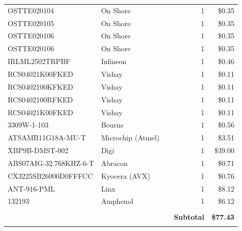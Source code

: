 \documentclass[journal,compsoc]{IEEEtran}
\begin{document}
\begin{table}[]
\begin{tabular}{|rrr|r|r|}
    \multicolumn{1}{|l}{OSTTE020104} & \multicolumn{1}{l}{On Shore} & \multicolumn{1}{r}{} & \multicolumn{1}{r}{1} & \$0.35  \\
    \multicolumn{1}{|l}{OSTTE020105} & \multicolumn{1}{l}{On Shore} & \multicolumn{1}{r}{} & \multicolumn{1}{r}{1} & \$0.35  \\
    \multicolumn{1}{|l}{OSTTE020106} & \multicolumn{1}{l}{On Shore} & \multicolumn{1}{r}{} & \multicolumn{1}{r}{1} & \$0.35  \\
    \multicolumn{1}{|l}{OSTTE020106} & \multicolumn{1}{l}{On Shore} & \multicolumn{1}{r}{} & \multicolumn{1}{r}{1} & \$0.35  \\
    \multicolumn{1}{|l}{IRLML2502TRPBF} & \multicolumn{1}{l}{Infineon} & \multicolumn{1}{r}{} & \multicolumn{1}{r}{1} & \$0.46  \\
    \multicolumn{1}{|l}{RCS04021K00FKED} & \multicolumn{1}{l}{Vishay} & \multicolumn{1}{r}{} & \multicolumn{1}{r}{1} & \$0.11  \\
    \multicolumn{1}{|l}{RCS0402100KFKED} & \multicolumn{1}{l}{Vishay} & \multicolumn{1}{r}{} & \multicolumn{1}{r}{1} & \$0.11  \\
    \multicolumn{1}{|l}{RCS0402100RFKED} & \multicolumn{1}{l}{Vishay} & \multicolumn{1}{r}{} & \multicolumn{1}{r}{1} & \$0.11  \\
    \multicolumn{1}{|l}{RCS04021K00FKED} & \multicolumn{1}{l}{Vishay} & \multicolumn{1}{r}{} & \multicolumn{1}{r}{1} & \$0.11  \\
    \multicolumn{1}{|l}{3309W-1-103} & \multicolumn{1}{l}{Bourns} & \multicolumn{1}{r}{} & \multicolumn{1}{r}{1} & \$0.56  \\
    \multicolumn{1}{|l}{ATSAMB11G18A-MU-T} & \multicolumn{1}{l}{Microchip (Atmel)} & \multicolumn{1}{r}{} & \multicolumn{1}{r}{1} & \$3.51  \\
    \multicolumn{1}{|l}{XBP9B-DMST-002} & \multicolumn{1}{l}{Digi} & \multicolumn{1}{r}{} & \multicolumn{1}{r}{1} & \$39.00  \\
    \multicolumn{1}{|l}{ABS07AIG-32.768KHZ-6-T} & \multicolumn{1}{l}{Abracon} & \multicolumn{1}{r}{} & \multicolumn{1}{r}{1} & \$0.71  \\
    \multicolumn{1}{|l}{CX3225SB26000D0FFFCC} & \multicolumn{1}{l}{Kyocera (AVX)} & \multicolumn{1}{r}{} & \multicolumn{1}{r}{1} & \$0.76  \\
    \multicolumn{1}{|l}{ANT-916-PML} & \multicolumn{1}{l}{Linx} & \multicolumn{1}{r}{} & \multicolumn{1}{r}{1} & \$8.12  \\
    \multicolumn{1}{|l}{132193} & \multicolumn{1}{l}{Amphenol} & \multicolumn{1}{r}{} & \multicolumn{1}{r}{1} & \$6.12  \\
          &       & \multicolumn{1}{r}{} & \multicolumn{1}{r}{} &  \\
\cmidrule{4-5}          &       &       & \cellcolor[rgb]{ .608,  .761,  .902} \textbf{Subtotal} & \cellcolor[rgb]{ .608,  .761,  .902} \textbf{\$77.43 } \\
    \midrule
          &       & \multicolumn{1}{r}{} & \multicolumn{1}{r}{} &  \\
    \midrule
    \end{tabular}%
  \label{tab:addlabel}%
\end{table}%
\end{document}
